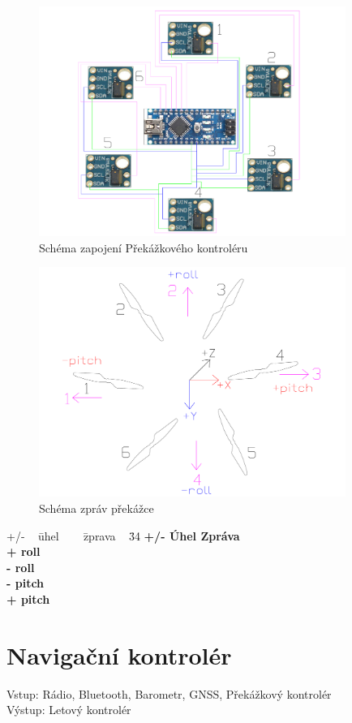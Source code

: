 \begin{figure}[h]
	\centering
	\includegraphics[width=10cm]{pictures/obstacle.pdf}
	\caption{Schéma zapojení Překážkového kontroléru}
\end{figure}

\begin{figure}[h]
	\centering
	\includegraphics[width=10cm]{pictures/obstacle_teo.pdf}
	\caption{Schéma zpráv překážce}
\end{figure}

\begin{tabbing}
	+/- ~ \= uhel ~~~ \= zprava ~
	\= 34 \kill
	\bfseries +/- \>
	\bfseries Úhel \>
	\bfseries Zpráva \\
	+\> roll   \\
	-\> roll   \\
	-\> pitch   \\
    +\> pitch   \\
\end{tabbing}

\section{Navigační kontrolér} 
Vstup: Rádio, Bluetooth, Barometr, GNSS, Překážkový kontrolér\\
Výstup: Letový kontrolér\\

